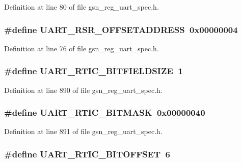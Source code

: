 Definition at line 80 of file gsn\_\-reg\_\-uart\_\-spec.h.

\hypertarget{a00575_ae0c367125bc1c9e53aee01b206728f90}{
\subsubsection[{UART\_\-RSR\_\-OFFSETADDRESS}]{\setlength{\rightskip}{0pt plus 5cm}\#define UART\_\-RSR\_\-OFFSETADDRESS~0x00000004}}
\label{a00575_ae0c367125bc1c9e53aee01b206728f90}


Definition at line 76 of file gsn\_\-reg\_\-uart\_\-spec.h.

\hypertarget{a00575_a6ab1765805c0b649e3023cffbdf8b03c}{
\subsubsection[{UART\_\-RTIC\_\-BITFIELDSIZE}]{\setlength{\rightskip}{0pt plus 5cm}\#define UART\_\-RTIC\_\-BITFIELDSIZE~1}}
\label{a00575_a6ab1765805c0b649e3023cffbdf8b03c}


Definition at line 890 of file gsn\_\-reg\_\-uart\_\-spec.h.

\hypertarget{a00575_a85069edee0debd390ba0338c2875a5b0}{
\subsubsection[{UART\_\-RTIC\_\-BITMASK}]{\setlength{\rightskip}{0pt plus 5cm}\#define UART\_\-RTIC\_\-BITMASK~0x00000040}}
\label{a00575_a85069edee0debd390ba0338c2875a5b0}


Definition at line 891 of file gsn\_\-reg\_\-uart\_\-spec.h.

\hypertarget{a00575_ab43f4d13c4a0c2e9fd693cdabea3e267}{
\subsubsection[{UART\_\-RTIC\_\-BITOFFSET}]{\setlength{\rightskip}{0pt plus 5cm}\#define UART\_\-RTIC\_\-BITOFFSET~6}}
\label{a00575_ab43f4d13c4a0c2e9fd693cdabea3e267}



